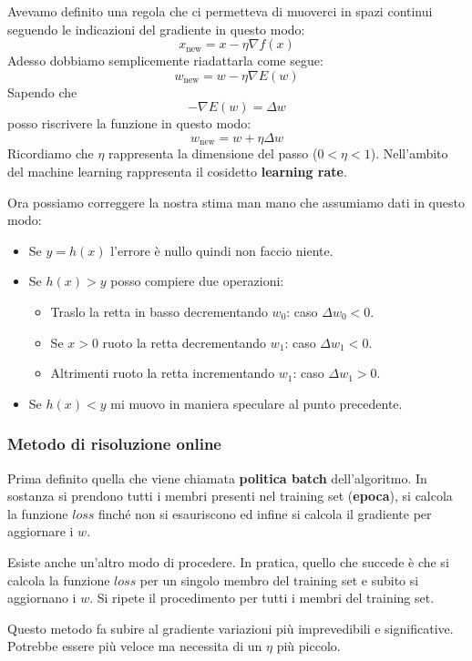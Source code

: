 Avevamo definito una regola che ci permetteva di muoverci in spazi continui seguendo le indicazioni del gradiente in questo
modo:
\[ x_{\text{new}} = x - \eta \nabla f(x) \]
Adesso dobbiamo semplicemente riadattarla come segue:
\[ w_{\text{new}} = w - \eta \nabla E(w) \]
Sapendo che
\[ -\nabla E(w) = \Delta w \]
posso riscrivere la funzione in questo modo:
\[ w_{\text{new}} = w + \eta \Delta w \]
Ricordiamo che $\eta$ rappresenta la dimensione del passo ($0 < \eta < 1$). Nell'ambito del machine learning rappresenta il cosidetto
\textbf{learning rate}.

Ora possiamo correggere la nostra stima man mano che assumiamo dati in questo modo:
\begin{itemize}
	\item Se $y = h(x)$ l'errore \`e nullo quindi non faccio niente.
	\item Se $h(x) > y$ posso compiere due operazioni:
	      \begin{itemize}
		      \item Traslo la retta in basso decrementando $w_0$: caso $\Delta w_0 < 0$.
		      \item Se $x > 0$ ruoto la retta decrementando $w_1$: caso $\Delta w_1 < 0$.
		      \item Altrimenti ruoto la retta incrementando $w_1$: caso $\Delta w_1 > 0$.
	      \end{itemize}
	\item Se $h(x) < y$ mi muovo in maniera speculare al punto precedente.
\end{itemize}

\subsubsection{Metodo di risoluzione online}
Prima definito quella che viene chiamata \textbf{politica batch} dell'algoritmo. In sostanza si prendono tutti i membri
presenti nel training set (\textbf{epoca}), si calcola la funzione $loss$ finch\'e non si esauriscono ed infine si calcola
il gradiente per aggiornare i $w$.

Esiste anche un'altro modo di procedere. In pratica, quello che succede \`e che si calcola la funzione $loss$ per un singolo
membro del training set e subito si aggiornano i $w$. Si ripete il procedimento per tutti i membri del training set.

Questo metodo fa subire al gradiente variazioni pi\`u imprevedibili e significative. Potrebbe essere pi\`u veloce ma
necessita di un $\eta$ pi\`u piccolo.
